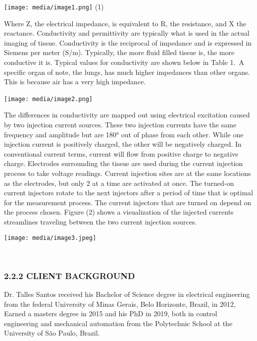 \texttt{[image: media/image1.png]}
(1)~

Where Z, the electrical impedance, is equivalent to R, the resistance,
and X the reactance. Conductivity and permittivity are typically what is
used in the actual imaging of tissue. Conductivity is the reciprocal of
impedance and is expressed in Siemens per meter (S/m). Typically, the
more fluid filled tissue is, the more conductive it is. Typical values
for conductivity are shown below in Table 1.~A specific organ of note,
the lungs, has much higher impedances than other organs. This is because
air has a very high impedance.

\texttt{[image: media/image2.png]}~

The differences in conductivity are mapped out using electrical
excitation caused by two injection current sources. These two injection
currents have the same frequency and amplitude but are 180° out of phase
from each other. While one injection current is positively charged, the
other will be negatively charged. In conventional current terms, current
will flow from positive charge to negative charge. Electrodes
surrounding the tissue are used during the current injection process to
take voltage readings. Current injection sites are at the same locations
as the electrodes, but only 2 at a time are activated at once. The
turned-on current injectors rotate to the next injectors after a period
of time that is optimal for the measurement process. The current
injectors that are turned on depend on the process chosen. Figure (2)
shows a visualization of the injected currents streamlines traveling
between the two current injection sources.~

\texttt{[image: media/image3.jpeg]}

~

\subsubsection{2.2.2 CLIENT BACKGROUND}\label{client-background}

Dr. Talles Santos received his Bachelor of Science degree in electrical
engineering from the federal University of Minas Gerais, Belo Horizonte,
Brazil, in 2012, Earned a master\textquotesingle s degree in 2015 and
his PhD in 2019, both in control engineering and mechanical automation
from the Polytechnic School at the University of São Paulo, Brazil.~~

